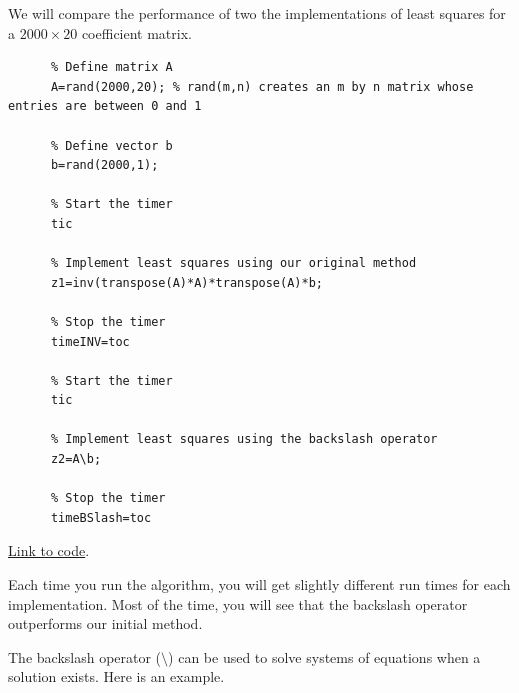 \documentclass{ximera}
\begin{document}
 
\begin{example}\label{ex:LeastSquaresComp2}
We will compare the performance of two the implementations of least squares for a $2000\times 20$ coefficient matrix.
 
    \begin{verbatim}
      % Define matrix A
      A=rand(2000,20); % rand(m,n) creates an m by n matrix whose entries are between 0 and 1
               
      % Define vector b
      b=rand(2000,1);
       
      % Start the timer
      tic
       
      % Implement least squares using our original method
      z1=inv(transpose(A)*A)*transpose(A)*b;
       
      % Stop the timer
      timeINV=toc
       
      % Start the timer
      tic
       
      % Implement least squares using the backslash operator
      z2=A\b;
       
      % Stop the timer
      timeBSlash=toc
    \end{verbatim}
 
\href{https://sagecell.sagemath.org/?z=eJylkDFPwzAQhXdL_g9viZSgDk7WKkMQSxeWSkxd7ORoLGI72Je28OtxgCK6sHC65e7d0_d0BR7o2XqC0xztBZ0UXRu1H8pGKbVpVLUFis-F2_gKfSTNlKA9HMwb_NV4HkMikM_DKkeCIT4Teah8PKCWAt8lRXGlnqjnEGGkML-odbWVYr3as44MHglsHUUp2PZfys7NE7mMw0Q6MdLrkpkJS7L-iLBEhGiP1usJjngMgxTvdWv9qeTMSXMOW3bVXe6b2fyAw3zLdbR7fGo59P9LtjqM7l_SpNOIMFPU-QE5XNN2h7_o9_vVsQb4AOCph5E=&lang=octave&interacts=eJyLjgUAARUAuQ==}{Link to code}.  
 
Each time you run the algorithm, you will get slightly different run times for each implementation.  Most of the time, you will see that the backslash operator outperforms our initial method.
\end{example}
 
The
backslash operator ($\setminus$) can be used to solve systems of equations when a solution exists.  Here is an example.
 
\end{document}
